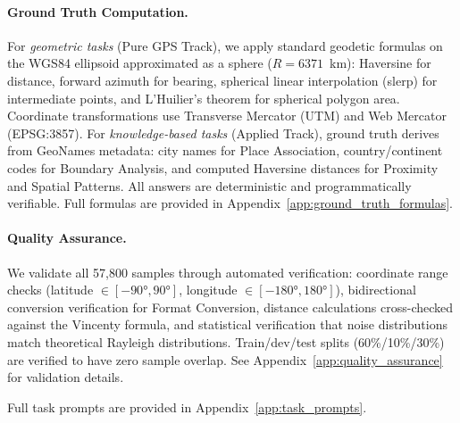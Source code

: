 \paragraph{Ground Truth Computation.}
For \textit{geometric tasks} (Pure GPS Track), we apply standard geodetic formulas on the WGS84 ellipsoid approximated as a sphere ($R = 6371$~km): Haversine for distance, forward azimuth for bearing, spherical linear interpolation (slerp) for intermediate points, and L'Huilier's theorem for spherical polygon area. Coordinate transformations use Transverse Mercator (UTM) and Web Mercator (EPSG:3857). For \textit{knowledge-based tasks} (Applied Track), ground truth derives from GeoNames metadata: city names for Place Association, country/continent codes for Boundary Analysis, and computed Haversine distances for Proximity and Spatial Patterns. All answers are deterministic and programmatically verifiable. Full formulas are provided in Appendix~\ref{app:ground_truth_formulas}.

\paragraph{Quality Assurance.}
We validate all 57,800 samples through automated verification: coordinate range checks (latitude $\in [-90°, 90°]$, longitude $\in [-180°, 180°]$), bidirectional conversion verification for Format Conversion, distance calculations cross-checked against the Vincenty formula, and statistical verification that noise distributions match theoretical Rayleigh distributions. Train/dev/test splits (60\%/10\%/30\%) are verified to have zero sample overlap. See Appendix~\ref{app:quality_assurance} for validation details.

Full task prompts are provided in Appendix~\ref{app:task_prompts}.

